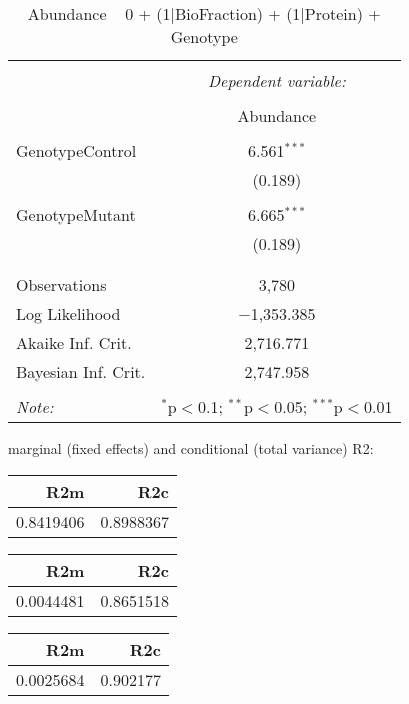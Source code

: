 \documentclass[11pt]{report}
\begin{document}
\begin{table}[!htbp] \centering 
  \caption{Abundance ~ 0 + (1|BioFraction) + (1|Protein) + Genotype} 
  \label{} 
\begin{tabular}{@{\extracolsep{5pt}}lc} 
\\[-1.8ex]\hline 
\hline \\[-1.8ex] 
 & \multicolumn{1}{c}{\textit{Dependent variable:}} \\ 
\cline{2-2} 
\\[-1.8ex] & Abundance \\ 
\hline \\[-1.8ex] 
 GenotypeControl & 6.561$^{***}$ \\ 
  & (0.189) \\ 
  & \\ 
 GenotypeMutant & 6.665$^{***}$ \\ 
  & (0.189) \\ 
  & \\ 
\hline \\[-1.8ex] 
Observations & 3,780 \\ 
Log Likelihood & $-$1,353.385 \\ 
Akaike Inf. Crit. & 2,716.771 \\ 
Bayesian Inf. Crit. & 2,747.958 \\ 
\hline 
\hline \\[-1.8ex] 
\textit{Note:}  & \multicolumn{1}{r}{$^{*}$p$<$0.1; $^{**}$p$<$0.05; $^{***}$p$<$0.01} \\ 
\end{tabular} 
\end{table} 
marginal (fixed effects) and conditional (total variance) R2:

\begin{tabular}{r|r}
\hline
R2m & R2c\\
\hline
0.8419406 & 0.8988367\\
\hline
\end{tabular}

\begin{tabular}{r|r}
\hline
R2m & R2c\\
\hline
0.0044481 & 0.8651518\\
\hline
\end{tabular}

\begin{tabular}{r|r}
\hline
R2m & R2c\\
\hline
0.0025684 & 0.902177\\
\hline
\end{tabular}
\end{document}
